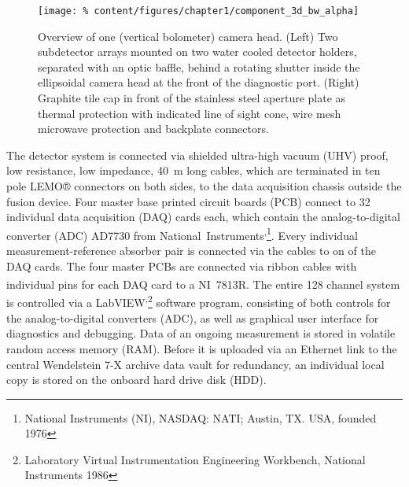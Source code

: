 %
            \begin{figure}[t]%
                \centering%
                \texttt{[image: \%
                    content/figures/chapter1/component\_3d\_bw\_alpha]}%
                \caption{%
                    Overview of one (vertical bolometer) camera head. (Left) Two subdetector arrays mounted on two water cooled detector holders, separated with an optic baffle, behind a rotating shutter inside the ellipsoidal camera head at the front of the diagnostic port. (Right) Graphite tile cap in front of the stainless steel aperture plate as thermal protection with indicated line of sight cone, wire mesh microwave protection and backplate connectors.}\label{fig:component_3D}%
            \end{figure}%
%
            The detector system is connected via shielded ultra-high vacuum (UHV) proof, low resistance, low impedance, \mbox{\SI{40}{\meter}} long cables, which are terminated in ten pole LEMO® connectors on both sides, to the data acquisition chassis outside the fusion device. Four master base printed circuit boards (PCB) connect to 32 individual data acquisition (DAQ) cards each, which contain the analog-to-digital converter (ADC) AD7730 from \mbox{National Instruments\textsuperscript{\textregistered,}}\footnote[1]{National Instruments (NI), NASDAQ: NATI; Austin, TX. USA, founded 1976}. Every individual measurement-reference absorber pair is connected via the cables to on of the DAQ cards. The four master PCBs are connected via ribbon cables with individual pins for each DAQ card to a \mbox{NI\textsuperscript{\textregistered} 7813R}. The entire 128 channel system is controlled via a \mbox{LabVIEW\textsuperscript{\textregistered,}}\footnote[2]{Laboratory Virtual Instrumentation Engineering Workbench, National Instruments 1986} software program, consisting of both controls for the analog-to-digital converters (ADC), as well as graphical user interface for diagnostics and debugging. Data of an ongoing measurement is stored in volatile random access memory (RAM). Before it is uploaded via an Ethernet link to the central Wendelstein 7-X archive data vault for redundancy, an individual local copy is stored on the onboard hard drive disk (HDD).%
%
